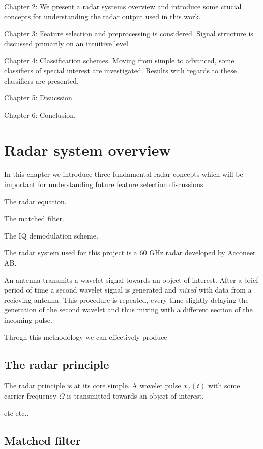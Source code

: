 \documentclass[a4paper, 12pt]{article}
\begin{document}
Chapter 2: We present a radar systems overview and introduce some crucial concepts for understanding the radar output used in this work. 

Chapter 3: Feature selection and preprocessing is considered. Signal structure is discussed primarily on an intuitive level. 

Chapter 4: Classification schemes. Moving from simple to advanced, some classifiers of special interest are investigated. Results with regards to these classifiers are presented.

Chapter 5: Disucssion.

Chapter 6: Conclusion.

\section{Radar system overview}

In this chapter we introduce three fundamental radar concepts which will be important for understanding future feature selection discussions. 

The radar equation.

The matched filter.

The IQ demodulation scheme. 

The radar system used for this project is a 60 GHz radar developed by Acconeer AB.

An antenna transmits a wavelet signal towards an object of interest. After a brief period of time a second wavelet signal is generated and \emph{mixed} with data from a recieving antenna. This procedure is repeated, every time slightly delaying the generation of the second wavelet and thus mixing with a different section of the incoming pulse. 

Throgh this methodology we can effectively produce

\subsection{The radar principle}

The radar principle is at its core simple.  A wavelet pulse $x_T(t)$ with some carrier frequency $\Omega$  is transmitted towards an object of interest. 

etc etc..


\subsection{Matched filter}
\end{document}
